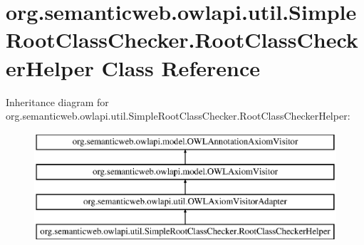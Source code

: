 \hypertarget{classorg_1_1semanticweb_1_1owlapi_1_1util_1_1_simple_root_class_checker_1_1_root_class_checker_helper}{\section{org.\-semanticweb.\-owlapi.\-util.\-Simple\-Root\-Class\-Checker.\-Root\-Class\-Checker\-Helper Class Reference}
\label{classorg_1_1semanticweb_1_1owlapi_1_1util_1_1_simple_root_class_checker_1_1_root_class_checker_helper}
}
Inheritance diagram for org.\-semanticweb.\-owlapi.\-util.\-Simple\-Root\-Class\-Checker.\-Root\-Class\-Checker\-Helper\-:\begin{figure}[H]
\begin{center}
\leavevmode
\includegraphics[height=4.000000cm]{classorg_1_1semanticweb_1_1owlapi_1_1util_1_1_simple_root_class_checker_1_1_root_class_checker_helper}
\end{center}
\end{figure}
